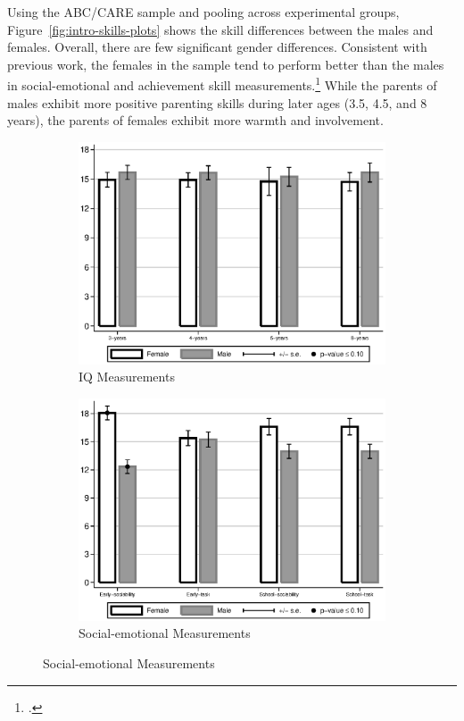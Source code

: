 Using the ABC/CARE sample and pooling across experimental groups, Figure~\ref{fig:intro-skills-plots} shows the skill differences between the males and females. Overall, there are few significant gender differences. Consistent with previous work, the females in the sample tend to perform better than the males in social-emotional and achievement skill measurements.\footnote{\citet{Baker-Milligan_2013_Boy-Girl-Differences}.} While the parents of males exhibit more positive parenting skills during later ages (3.5, 4.5, and 8 years), the parents of females exhibit more warmth and involvement.

\begin{figure}
\begin{center}
\caption{Differences Between ABC/CARE Males and Females, Skill Measurements}
\label{fig:intro-skills-plots}
\begin{subfigure}[b]{0.49\textwidth}
	\caption{IQ Measurements}
	\label{fig:intro-skills-plots-cog}
	\includegraphics[width=\textwidth]{../output/abccare-gdiff-cog}
\end{subfigure}
\begin{subfigure}[b]{0.49\textwidth}
	\caption{Social-emotional Measurements}
	\label{fig:intro-skills-plots-ncog}
	\includegraphics[width=\textwidth]{../output/abccare-gdiff-ncog}
\end{subfigure}


\end{center}
\end{figure}
